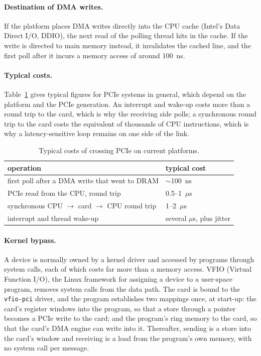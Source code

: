 \documentclass[11pt]{article}
\begin{document}
\paragraph{Destination of DMA writes.} If the platform places DMA writes
directly into the CPU cache (Intel's Data Direct I/O, DDIO), the next read of
the polling thread hits in the cache. If the write is directed to main memory
instead, it invalidates the cached line, and the first poll after it incurs a
memory access of around 100~ns.

\paragraph{Typical costs.} Table~\ref{tab:pciecost} gives typical figures for
PCIe systems in general, which depend on the platform and the PCIe
generation. An interrupt and wake-up costs more than
a round trip to the card, which is why the receiving side polls; a synchronous
round trip to the card costs the equivalent of thousands of CPU instructions,
which is why a latency-sensitive loop remains on one side of the link.

\begin{table}[htbp]
\centering
\small
\caption{Typical costs of crossing PCIe on current platforms.}
\label{tab:pciecost}
\begin{tabular}{ll}
\toprule
operation & typical cost \\
\midrule
first poll after a DMA write that went to DRAM & $\sim$100~ns \\
PCIe read from the CPU, round trip & 0.5--1~$\mu$s \\
synchronous CPU $\to$ card $\to$ CPU round trip & 1--2~$\mu$s \\
interrupt and thread wake-up & several $\mu$s, plus jitter \\
\bottomrule
\end{tabular}
\end{table}

\paragraph{Kernel bypass.} A device is normally owned by a kernel driver and
accessed by programs through system calls, each of which costs far more than a
memory access. VFIO (Virtual Function I/O), the Linux framework for assigning a
device to a user-space program, removes system calls from the data path. The
card is bound to the \texttt{vfio-pci} driver, and the program establishes two
mappings once, at start-up: the card's register windows into the program, so
that a store through a pointer becomes a PCIe write to the card; and the
program's ring memory to the card, so that the card's DMA engine can write into
it. Thereafter, sending is a store into the card's window and receiving is a
load from the program's own memory, with no system call per message.
\end{document}

